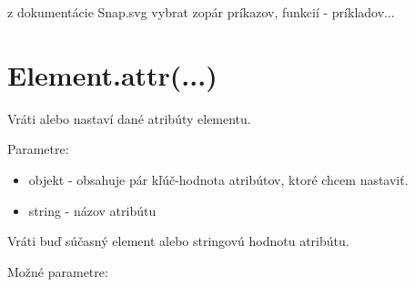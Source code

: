 
z dokumentácie Snap.svg vybrat zopár príkazov, funkcií - príkladov...


\section{Element.attr(...)}
Vráti alebo nastaví dané atribúty elementu.

Parametre:
\begin{itemize}
	\item objekt - obsahuje pár kľúč-hodnota atribútov, ktoré chcem nastaviť.
	\item string - názov atribútu
\end{itemize}
Vráti buď súčasný element alebo stringovú hodnotu atribútu.

Možné parametre:

